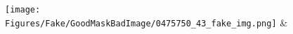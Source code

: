 \documentclass[runningheads]{llncs}
\begin{document}
\begin{figure}[tb]
\texttt{[image: Figures/Fake/GoodMaskBadImage/0475750\_43\_fake\_img.png]} &   %
\end{figure}
\end{document}
